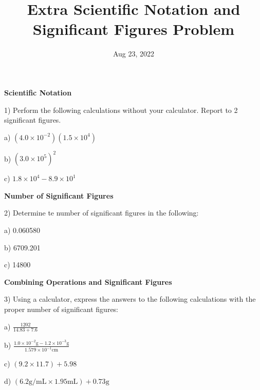 \documentclass[12pt]{article}
\title{\textbf{Extra Scientific Notation and  Significant Figures Problem}}
\date{Aug 23, 2022}
\begin{document}
\maketitle 

\textbf{Scientific Notation}

1) Perform the following calculations without your calculator. Report
to 2 significant figures.

a) $(4.0 \times 10^{-2})(1.5 \times 10^4)$

b) $(3.0 \times 10^5)^2$

c) $1.8 \times 10^4 - 8.9 \times 10^1$

\textbf{Number of Significant Figures}

2) Determine te number of significant figures in the following:

a) 0.060580

b) 6709.201

c) 14800

\textbf{Combining Operations and Significant Figures}

3) Using a calculator, express the answers to the following calculations with
the proper number of significant figures:

a) $\frac{1202}{14.83 + 7.6}$

b) $\frac{1.0 \times 10^{-2} \text{g} - 1.2 \times 10^{-3}\text{g}}{1.579 \times 10^{-1} \text{cm}}$

c) $(9.2 \times 11.7) + 5.98$

d) $(6.2 \text{g/mL} \times 1.95 \text{mL}) + 0.73 \text{g}$
\end{document}
